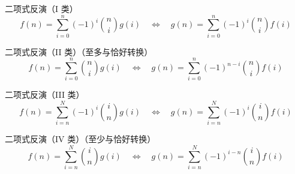 二项式反演（I 类）
\[
f(n) = \sum_{i=0}^{n} (-1)^i \binom{n}{i} g(i) \quad\Longleftrightarrow\quad 
g(n) = \sum_{i=0}^{n} (-1)^i \binom{n}{i} f(i)
\]

二项式反演（II 类）（至多与恰好转换）
\[
f(n) = \sum_{i=0}^{n} \binom{n}{i} g(i) \quad\Longleftrightarrow\quad 
g(n) = \sum_{i=0}^{n} (-1)^{n-i} \binom{n}{i} f(i)
\]

二项式反演（III 类）
\[
f(n) = \sum_{i=n}^{N} (-1)^i \binom{i}{n} g(i) \quad\Longleftrightarrow\quad 
g(n) = \sum_{i=n}^{N} (-1)^i \binom{i}{n} f(i)
\]

二项式反演（IV 类）（至少与恰好转换）
\[
f(n) = \sum_{i=n}^{N} \binom{i}{n} g(i) \quad\Longleftrightarrow\quad 
g(n) = \sum_{i=n}^{N} (-1)^{i-n} \binom{i}{n} f(i)
\]